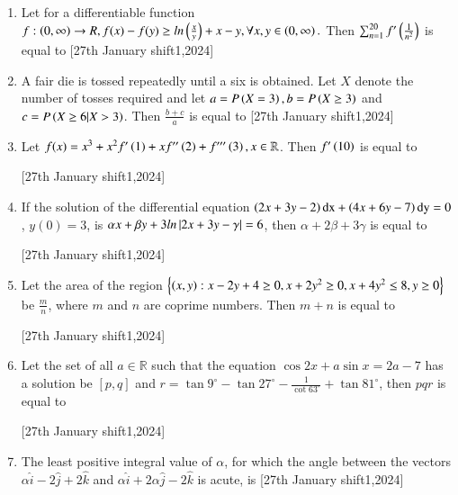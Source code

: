 \documentclass[journal]{IEEEtran}
\begin{document}
\begin{enumerate}[start=16]
\item Let for a differentiable function $f : \left(0, \infty\right)\rightarrow R, f(x)-f(y)\geq ln\left(\frac{x}{y}\right)+x-y,\forall x,y \in\left(0,\infty\right).$ Then $\sum_{n=1}^{20}f'\left(\frac{1}{n^2}\right)$ is equal to \underline{\hspace{1cm}} \hfill{[27th January shift1,2024]}\\

\item A fair die is tossed repeatedly until a six is obtained. Let $X$ denote the number of tosses required and let $a=P\left(X=3\right), b=P\left(X\geq 3\right)$ and $c=P\left(X\geq 6 |X>3\right)$. Then $\frac{b+c}{a}$ is equal to \underline{\hspace{1cm}} \hfill{[27th January shift1,2024]}\\

\item Let $f(x)=x^3+x^2f'\left(1\right)+xf''\left(2\right)+f'''\left(3\right), x \in \mathbb R$. Then $f'\left(10\right)$ is equal to \underline{\hspace{1cm}}

    \hfill{[27th January shift1,2024]}\\

\item If the solution of the differential equation $\left(2x+3y-2\right)\text{dx}+\left(4x+6y-7\right)\text{dy}=0$, $y(0)=3$, is $\alpha x+\beta y+3 ln\left\vert2x+3y-\gamma\right\vert=6$, then $\alpha+2\beta+3\gamma$ is equal to \underline{\hspace{1cm}}

    \hfill{[27th January shift1,2024]}\\

\item Let the area of the region $\left\{\left(x,y\right): x-2y+4\geq 0,x+2y^2\geq 0,x+4y^2\leq 8,y\geq 0\right\}$ be $\frac{m}{n}$, where $m$ and $n$ are coprime numbers. Then $m+n$ is equal to \underline{\hspace{1cm}}
    
    \hfill{[27th January shift1,2024]}\\

\item Let the set of all $a\in \mathbb R$ such that the equation $\cos 2x+a\sin x=2a-7$ has a solution be ${[p,q]}$ and $r=\tan 9^{\circ}-\tan 27^{\circ}-\frac{1}{\cot 63^{\circ}}+\tan 81^{\circ}$, then $pqr$ is equal to \underline{\hspace{1cm}}
    
    \hfill{[27th January shift1,2024]}\\
  
\item The least positive integral value of $\alpha$, for which the angle between the vectors $\alpha\hat{i}-2\hat{j}+2\hat{k}$ and $\alpha\hat{i}+2\alpha\hat{j}-2\hat{k}$ is acute, is \underline{\hspace{1cm}} \hfill{[27th January shift1,2024]}\\

\end{enumerate}
\end{document}
